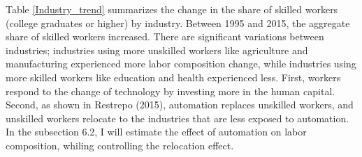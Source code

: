 \documentclass[12pt]{article}
\begin{document}
Table \ref{Industry_trend} summarizes the change in the share of skilled workers (college graduates or higher) by industry. Between 1995 and 2015, the aggregate share of skilled workers increased. There are significant variations between industries; industries using more unskilled workers like agriculture and manufacturing experienced more labor composition change, while industries using more skilled workers like education and health experienced less. First, workers respond to the change of technology by investing more in the human capital. Second, as shown in Restrepo (2015)\nocite{Restrepo2015}, automation replaces unskilled workers, and unskilled workers relocate to the industries that are less exposed to automation. In the subsection 6.2, I will estimate the effect of automation on labor composition, whiling controlling the relocation effect. 
\end{document}
